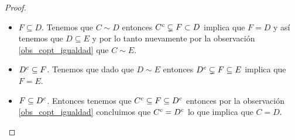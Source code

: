 \documentclass[tesis.tex]{subfiles}
\begin{document}
\begin{proof}
\begin{itemize}
\begin{itemize}
			\item $F \subseteq D$.
			Tenemos que $C \sim D$ entonces $C^{c} \subsetneq F \subset D$ implica que $F = D$ y así tenemos que $D \subseteq E$ y por lo tanto nuevamente por la observación \ref{obs_copt_igualdad} que $C \sim E$.
			
			\item $D^{c} \subseteq F$. 
			Tenemos que dado que $D \sim E$ entonces $D^{c} \subsetneq F \subseteq E$ implica que $F = E$.
			
			\item $F \subseteq D^{c}$.
			Entonces tenemos que $C^{c} \subseteq F \subseteq D^{c}$ entonces por la observación \ref{obs_copt_igualdad} concluimos que $C^{c} = D^{c}$ lo que implica que $C = D$.
		\end{itemize}
	\end{itemize}
\end{proof}
\end{document}
